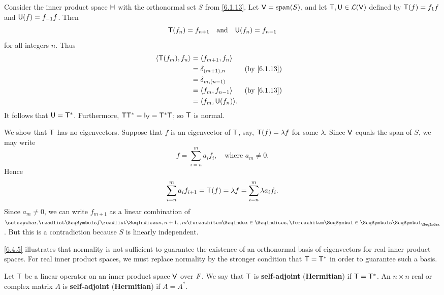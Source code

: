 \begin{eg}\label{6.4.7}
  Consider the inner product space \(\mathsf{H}\) with the orthonormal set \(S\) from \cref{6.1.13}.
  Let \(\V = \spn{S}\), and let \(\mathsf{T}, \mathsf{U} \in \mathcal{L}(\mathsf{V})\) defined by \(\mathsf{T}(f) = f_1 f\) and \(\mathsf{U}(f) = f_{-1} f\).
  Then
  \[
    \mathsf{T}(f_n) = f_{n + 1} \quad \text{and} \quad \mathsf{U}(f_n) = f_{n - 1}
  \]
  for all integers \(n\).
  Thus
  \begin{align*}
    \inn{\T(f_m), f_n} & = \inn{f_{m + 1}, f_n}                                \\
                       & = \delta_{(m + 1), n}  &  & \text{(by \cref{6.1.13})} \\
                       & = \delta_{m, (n - 1)}                                 \\
                       & = \inn{f_m, f_{n - 1}} &  & \text{(by \cref{6.1.13})} \\
                       & = \inn{f_m, \U(f_n)}.
  \end{align*}
  It follows that \(\mathsf{U} = \mathsf{T}^*\).
  Furthermore, \(\T \T^* = \IT[\V] = \T^* \T\);
  so \(\mathsf{T}\) is normal.

  We show that \(\mathsf{T}\) has no eigenvectors.
  Suppose that \(f\) is an eigenvector of \(\mathsf{T}\), say, \(\mathsf{T}(f) = \lambda f\) for some \(\lambda\).
  Since \(\mathsf{V}\) equals the span of \(S\), we may write
  \[
    f = \sum_{i = n}^m a_i f_i, \quad \text{where } a_m \neq 0.
  \]
  Hence
  \[
    \sum_{i = n}^m a_i f_{i + 1} = \mathsf{T}(f) = \lambda f = \sum_{i = n}^m \lambda a_i f_i.
  \]
  Since \(a_m \neq 0\), we can write \(f_{m + 1}\) as a linear combination of \(\seq{f}{n,n+1,,m}\).
  But this is a contradiction because \(S\) is linearly independent.
\end{eg}

\begin{note}
  \cref{6.4.5} illustrates that normality is not sufficient to guarantee the existence of an orthonormal basis of eigenvectors for real inner product spaces.
  For real inner product spaces, we must replace normality by the stronger condition that \(\mathsf{T} = \mathsf{T}^*\) in order to guarantee such a basis.
\end{note}

\begin{defn}\label{6.4.8}
  Let \(\mathsf{T}\) be a linear operator on an inner product space \(\mathsf{V}\) over \(\mathit{F}\).
  We say that \(\mathsf{T}\) is \textbf{self-adjoint} (\textbf{Hermitian}) if \(\mathsf{T} = \mathsf{T}^*\).
  An \(n \times n\) real or complex matrix \(A\) is \textbf{self-adjoint} (\textbf{Hermitian}) if \(A = A^*\).
\end{defn}


